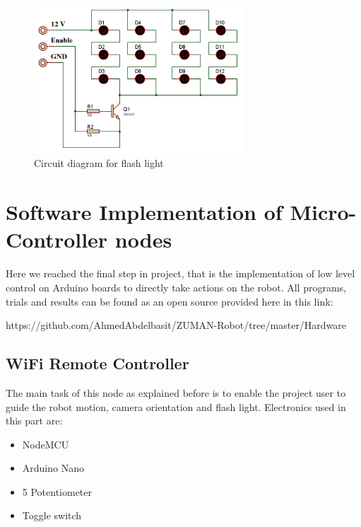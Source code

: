 \documentclass[12pt]{book}
\begin{document}
\begin{itemize}
	\begin{figure}
		\centering
		\includegraphics[width =0.7\textwidth]{Fig/light-circuit.png}
		\caption{Circuit diagram for flash light}
		\label{fig:light-circuit}
	\end{figure}
\end{itemize}






\chapter{Software Implementation of Micro-Controller nodes}
Here we reached the final step in project, that is the implementation of low level control on Arduino boards to directly take actions on the robot. All programs, trials and results can be found as an open source provided here in this link:
\begin{center}
	 https://github.com/AhmedAbdelbasit/ZUMAN-Robot/tree/master/Hardware 
\end{center}


\section{WiFi Remote Controller}
	The main task of this node as explained before is to enable the project user to guide the robot motion, camera orientation and flash light. 
	Electronics used in this part are:
	\begin{itemize}
		\item NodeMCU
		\item Arduino Nano
		\item 5 Potentiometer
		\item Toggle switch\\
	\end{itemize}
\end{document}
